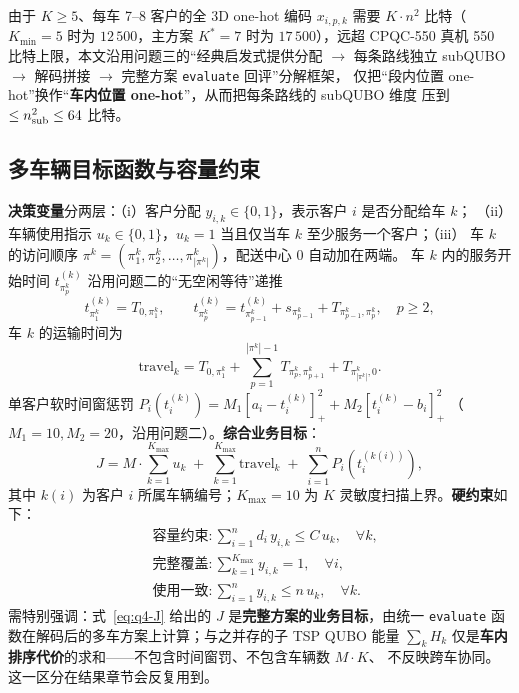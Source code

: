 \documentclass[UTF8,12pt,a4paper]{ctexart}
\begin{document}
由于 $K\ge 5$、每车 7--8 客户的全 3D one-hot 编码 $x_{i,p,k}$ 需要 $K\!\cdot\!n^2$
比特（$K_{\min}\!=\!5$ 时为 $12\,500$，主方案 $K^{*}\!=\!7$ 时为 $17\,500$），远超 CPQC-550
真机 550 比特上限，本文沿用问题三的``经典启发式提供分配 $\to$
每条路线独立 subQUBO $\to$ 解码拼接 $\to$ 完整方案 \texttt{evaluate} 回评''分解框架，
仅把``段内位置 one-hot''换作``\textbf{车内位置 one-hot}''，从而把每条路线的 subQUBO 维度
压到 $\le n_{\rm sub}^2\le 64$ 比特。

\subsection{多车辆目标函数与容量约束}
\label{subsec:q4-model}

\textbf{决策变量}分两层：（i）客户分配 $y_{i,k}\in\{0,1\}$，表示客户 $i$ 是否分配给车 $k$；
（ii）车辆使用指示 $u_k\in\{0,1\}$，$u_k=1$ 当且仅当车 $k$ 至少服务一个客户；（iii）
车 $k$ 的访问顺序 $\pi^k=(\pi_1^k,\pi_2^k,\dots,\pi_{|\pi^k|}^k)$，配送中心 $0$ 自动加在两端。
车 $k$ 内的服务开始时间 $t_{\pi_p^k}^{(k)}$ 沿用问题二的``无空闲等待''递推
\begin{equation}
\label{eq:q4-time}
t_{\pi_1^k}^{(k)}=T_{0,\pi_1^k},\qquad
t_{\pi_p^k}^{(k)}=t_{\pi_{p-1}^k}^{(k)}+s_{\pi_{p-1}^k}+T_{\pi_{p-1}^k,\pi_p^k},\quad p\ge 2,
\end{equation}
车 $k$ 的运输时间为
\begin{equation}
\label{eq:q4-travel}
\mathrm{travel}_k=T_{0,\pi_1^k}+\sum_{p=1}^{|\pi^k|-1}T_{\pi_p^k,\pi_{p+1}^k}+T_{\pi_{|\pi^k|}^k,0}.
\end{equation}
单客户软时间窗惩罚 $P_i(t_i^{(k)})=M_1[a_i-t_i^{(k)}]_+^2+M_2[t_i^{(k)}-b_i]_+^2$
（$M_1=10,M_2=20$，沿用问题二）。\textbf{综合业务目标}：
\begin{equation}
\label{eq:q4-J}
J=M\!\cdot\!\sum_{k=1}^{K_{\max}}u_k\;+\;\sum_{k=1}^{K_{\max}}\mathrm{travel}_k\;+\;\sum_{i=1}^{n}P_i(t_i^{(k(i))}),
\end{equation}
其中 $k(i)$ 为客户 $i$ 所属车辆编号；$K_{\max}=10$ 为 $K$ 灵敏度扫描上界。\textbf{硬约束}如下：
\begin{align}
\label{eq:q4-cap}
&\textbf{容量约束}: \sum_{i=1}^{n}d_i\,y_{i,k}\le C\,u_k,\quad \forall k,\\
\label{eq:q4-cover}
&\textbf{完整覆盖}: \sum_{k=1}^{K_{\max}}y_{i,k}=1,\quad \forall i,\\
\label{eq:q4-link}
&\textbf{使用一致}: \sum_{i=1}^{n}y_{i,k}\le n\,u_k,\quad \forall k.
\end{align}
需特别强调：式~\eqref{eq:q4-J} 给出的 $J$ 是\textbf{完整方案的业务目标}，由统一
\texttt{evaluate} 函数在解码后的多车方案上计算；与之并存的子 TSP QUBO 能量
$\sum_k H_k$ 仅是\textbf{车内排序代价}的求和——不包含时间窗罚、不包含车辆数 $M\!\cdot\!K$、
不反映跨车协同。这一区分在结果章节会反复用到。
\end{document}
